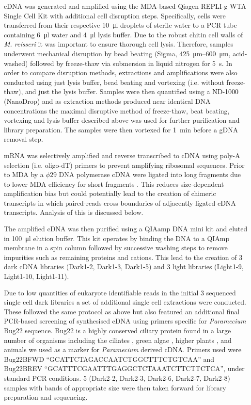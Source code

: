 cDNA was generated and amplified using the MDA-based Qiagen REPLI-g WTA Single Cell Kit \citep{Korfhage2015}
with additional cell disruption steps. 
Specifically, cells were transferred from their respective \SI{10}{\micro\litre} droplets of sterile water to
a PCR tube containing \SI{6}{\micro\litre} water and \SI{4}{\micro\litre} lysis buffer. 
Due to the robust chitin cell walls of \textit{M. reisseri} \citep{Kapaun1995} it was important to
ensure thorough cell lysis. Therefore, samples underwent mechanical disruption by bead beating (Sigma, \SIrange{425}{600}{\micro\metre}, 
acid-washed) followed by freeze-thaw via submersion in liquid nitrogen for \SI{5}{\second}.
In order to compare disruption methods, extractions and amplifications
were also conducted using just lysis buffer, bead beating and vortexing (i.e. without freeze-thaw), 
and just the lysis buffer.  Samples were then quantified using a ND-1000 (NanoDrop)
and as extraction methods produced near identical DNA concentrations 
the maximal disruptive method of freeze-thaw, beat beating, vortexing and lysis buffer
described above was used for further purification and library preparation.
The samples were then vortexed for \SI{1}{\minute} before a gDNA removal step.

mRNA was selectively amplified and reverse transcribed to cDNA using poly-A selection (i.e. oligo-dT) primers
to prevent amplifying ribosomal sequences. Prior to MDA by a \(\phi29\) DNA polymerase
cDNA were ligated into long fragments due to lower MDA efficiency for short fragments \citep{Korfhage2015}.
This reduces size-dependent amplification bias but could potentially lead to the creation
of chimeric transcripts in which paired-reads cross boundaries of adjacently ligated
cDNA transcripts.  Analysis of this is discussed below.

The amplified cDNA was then purified using a QIAamp DNA mini kit and eluted in \SI{100}{\micro\litre} elution buffer.
This kit operates by binding the DNA to a QIAmp membrane in a spin column followed by successive washing steps
to remove impurities such as remaining proteins and cations. This lead to the creation of 3 dark cDNA 
libraries (Dark1-2, Dark1-3, Dark1-5) and 3 light libraries (Light1-9, Light1-10, Light1-11).


Due to low quantities of eukaryote identifiable reads in the initial 3 sequenced single cell
dark libraries a set of additional single cell extractions were conducted. 
These followed the same protocol as above but also featured an additional
final PCR-based screening of synthesised cDNA using primers specific for \textit{Paramecium}
Bug22 sequence. Bug22 is a highly conserved ciliary protein found in a large number of organisms
including the ciliates \citep{Smith2005,Laligne2010}, green algae \citep{Keller2005,Laligne2010,Meng2014}, higher plants \citep{Hodges2011}, and animals \citep{MendesMaia2014} we used as a marker for \textit{Paramecium} derived cDNA.
Primers used were Bug22BFWD ``GCATTCTAGACCAATCTGGCTTTCTGTCAA'' and Bug22BREV ``GCATTTCGAATTTGAGGCTCTAAATCTTCTTCTCA'',
under standard PCR conditions.  5 (Dark2-2, Dark2-3, Dark2-6, Dark2-7, Dark2-8) samples with 
bands of appropriate size were then taken forward for library preparation and sequencing.


